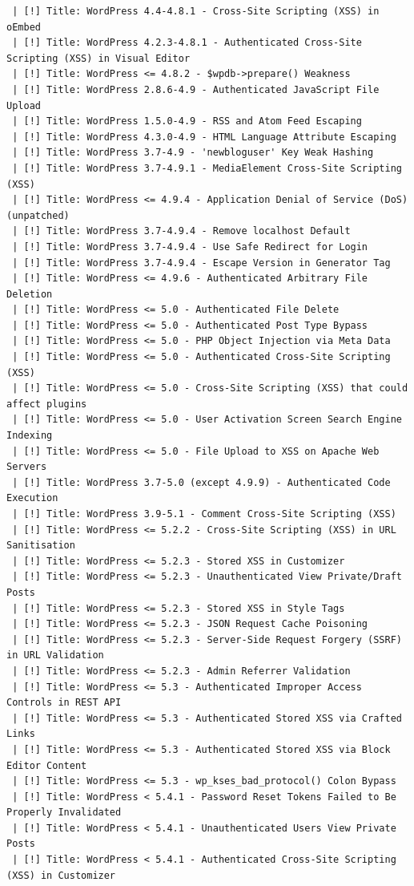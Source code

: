 \documentclass[11pt]{utalcaDoc}
\begin{document}
\begin{verbatim}
 | [!] Title: WordPress 4.4-4.8.1 - Cross-Site Scripting (XSS) in oEmbed
 | [!] Title: WordPress 4.2.3-4.8.1 - Authenticated Cross-Site Scripting (XSS) in Visual Editor
 | [!] Title: WordPress <= 4.8.2 - $wpdb->prepare() Weakness
 | [!] Title: WordPress 2.8.6-4.9 - Authenticated JavaScript File Upload
 | [!] Title: WordPress 1.5.0-4.9 - RSS and Atom Feed Escaping
 | [!] Title: WordPress 4.3.0-4.9 - HTML Language Attribute Escaping
 | [!] Title: WordPress 3.7-4.9 - 'newbloguser' Key Weak Hashing
 | [!] Title: WordPress 3.7-4.9.1 - MediaElement Cross-Site Scripting (XSS)
 | [!] Title: WordPress <= 4.9.4 - Application Denial of Service (DoS) (unpatched)
 | [!] Title: WordPress 3.7-4.9.4 - Remove localhost Default
 | [!] Title: WordPress 3.7-4.9.4 - Use Safe Redirect for Login
 | [!] Title: WordPress 3.7-4.9.4 - Escape Version in Generator Tag
 | [!] Title: WordPress <= 4.9.6 - Authenticated Arbitrary File Deletion
 | [!] Title: WordPress <= 5.0 - Authenticated File Delete
 | [!] Title: WordPress <= 5.0 - Authenticated Post Type Bypass
 | [!] Title: WordPress <= 5.0 - PHP Object Injection via Meta Data
 | [!] Title: WordPress <= 5.0 - Authenticated Cross-Site Scripting (XSS)
 | [!] Title: WordPress <= 5.0 - Cross-Site Scripting (XSS) that could affect plugins
 | [!] Title: WordPress <= 5.0 - User Activation Screen Search Engine Indexing
 | [!] Title: WordPress <= 5.0 - File Upload to XSS on Apache Web Servers
 | [!] Title: WordPress 3.7-5.0 (except 4.9.9) - Authenticated Code Execution
 | [!] Title: WordPress 3.9-5.1 - Comment Cross-Site Scripting (XSS)
 | [!] Title: WordPress <= 5.2.2 - Cross-Site Scripting (XSS) in URL Sanitisation
 | [!] Title: WordPress <= 5.2.3 - Stored XSS in Customizer
 | [!] Title: WordPress <= 5.2.3 - Unauthenticated View Private/Draft Posts
 | [!] Title: WordPress <= 5.2.3 - Stored XSS in Style Tags
 | [!] Title: WordPress <= 5.2.3 - JSON Request Cache Poisoning
 | [!] Title: WordPress <= 5.2.3 - Server-Side Request Forgery (SSRF) in URL Validation 
 | [!] Title: WordPress <= 5.2.3 - Admin Referrer Validation
 | [!] Title: WordPress <= 5.3 - Authenticated Improper Access Controls in REST API
 | [!] Title: WordPress <= 5.3 - Authenticated Stored XSS via Crafted Links
 | [!] Title: WordPress <= 5.3 - Authenticated Stored XSS via Block Editor Content
 | [!] Title: WordPress <= 5.3 - wp_kses_bad_protocol() Colon Bypass
 | [!] Title: WordPress < 5.4.1 - Password Reset Tokens Failed to Be Properly Invalidated
 | [!] Title: WordPress < 5.4.1 - Unauthenticated Users View Private Posts
 | [!] Title: WordPress < 5.4.1 - Authenticated Cross-Site Scripting (XSS) in Customizer

\end{verbatim}
\end{document}
